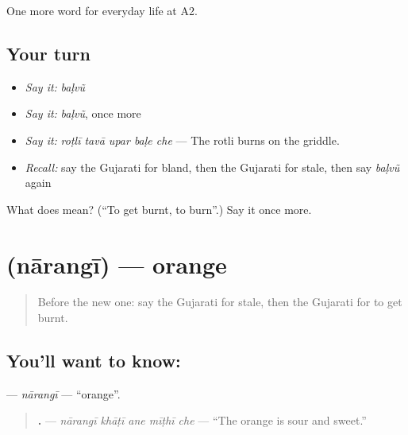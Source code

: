 \begin{grammarlens}[title={What you've built}]
One more word for everyday life at A2.
\end{grammarlens}

\subsection*{Your turn}
\begin{itemize}
\raggedright
  \item \emph{Say it:} \emph{baḷvũ}
  \item \emph{Say it:} \emph{baḷvũ}, once more
  \item \emph{Say it:} \emph{roṭlī tavā upar baḷe che} — The rotli burns on the griddle.
  \item \emph{Recall:} say the Gujarati for bland, then the Gujarati for stale, then say \emph{baḷvũ} again
\end{itemize}

\begin{tcolorbox}[breakable,colback=teal!4,colframe=teal!35!black,title={Before you move on}]
What does  mean? (\textquotedblleft{}To get burnt, to burn\textquotedblright{}.) Say it once more.
\end{tcolorbox}
\section[\texorpdfstring{\gu{નારંગી} (nārangī)}{નારંગી (nārangī)}]{ (nārangī) — orange}

\label{lesson:GU-C172-narangi}



\begin{quote}
Before the new one: say the Gujarati for stale, then the Gujarati for to get burnt.
\end{quote}

\subsection*{You'll want to know: }
\textbf{} — \emph{nārangī} — \textquotedblleft{}orange\textquotedblright{}.

\begin{quote}
\textbf{    .} — \emph{nārangī khāṭī ane mīṭhī che} — \textquotedblleft{}The orange is sour and sweet.\textquotedblright{}
\end{quote}


